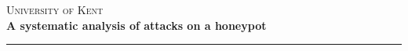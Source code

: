 \begin{titlepage}


\center

\textsc{\LARGE University of Kent}\\[5.5cm]
\textbf{\LARGE A systematic analysis of attacks on a honeypot}
\rule{\linewidth}{0.2mm}\\[0.3cm]
\\[2.0cm]
\\[0.2cm]
\\[0.2cm]

\vspace{5cm}



\end{titlepage}